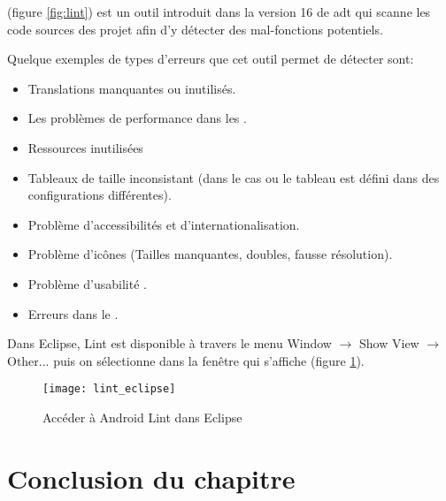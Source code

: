 \android{}  (figure \ref{fig:lint}) est un outil introduit dans la version 16 de \gls{adt} qui scanne les code sources des projet \android{} afin d'y détecter des mal-fonctions potentiels.

Quelque exemples de types d'erreurs que cet outil permet de détecter sont:

\begin{itemize}

\item Translations manquantes ou inutilisés.

\item Les problèmes de performance dans les .

\item Ressources inutilisées

\item Tableaux de taille inconsistant (dans le cas ou le tableau est défini dans des configurations différentes).

\item Problème d'accessibilités et d'internationalisation.

\item Problème d'icônes (Tailles manquantes, doubles, fausse résolution).

\item Problème d'usabilité .

\item Erreurs dans le .

\end{itemize}

Dans Eclipse, \android{} Lint est disponible à travers le menu Window $\rightarrow$ Show View $\rightarrow$ Other... puis on sélectionne  dans la fenêtre qui s'affiche (figure \ref{fig:lint_eclipse}).

\begin{figure}
\center
\texttt{[image: lint\_eclipse]}
\caption{Accéder à Android Lint dans Eclipse}
\label{fig:lint_eclipse}
\end{figure}

\section{Conclusion du chapitre}